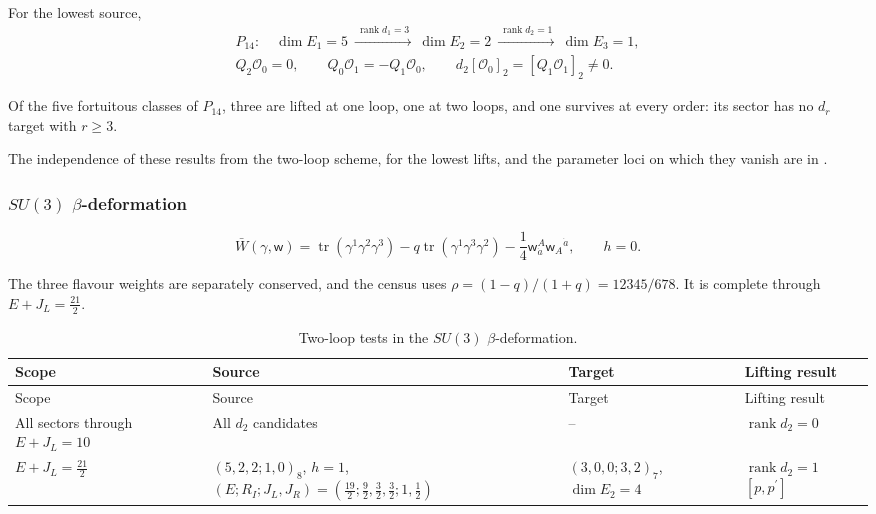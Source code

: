 \documentclass[11pt]{article}
\numberwithin{equation}{section}
\numberwithin{figure}{section}
\numberwithin{table}{section}
\begin{document}
For the lowest source,
\begin{equation}\label{local-ch9-ls-first-pages}
\begin{gathered}
P_{14}:\quad
\dim E_1=5\ \xrightarrow{\ \operatorname{rank}d_1=3\ }\
\dim E_2=2\ \xrightarrow{\ \operatorname{rank}d_2=1\ }\
\dim E_3=1,\\
Q_2\mathcal O_0=0,\qquad
Q_0\mathcal O_1=-Q_1\mathcal O_0,\qquad
d_2[\mathcal O_0]_2=[Q_1\mathcal O_1]_2\ne0.
\end{gathered}
\end{equation}

Of the five fortuitous classes of $P_{14}$, three are lifted at one loop, one at two loops, and one survives at every order: its sector has no $d_r$ target with $r\ge3$.

The independence of these results from the two-loop scheme, for the lowest lifts, and the parameter loci on which they vanish are in \cite[supplement, Sections S6.4 and S6.5]{Repo}.

\subsubsection{$SU(3)$ $\beta$-deformation}\label{sec-results-beta}

\begin{equation}\label{local-ch9-beta-action}
\bar W(\gamma,\mathsf w)
=\operatorname{tr}(\gamma^1\gamma^2\gamma^3)
-q\operatorname{tr}(\gamma^1\gamma^3\gamma^2)
-\frac14\mathsf w_{\dot a}^{A}\mathsf w_A{}^{\dot a},
\qquad h=0.
\end{equation}

The three flavour weights are separately conserved, and the census \cite[supplement, Section S6.7]{Repo} uses $\rho=(1-q)/(1+q)=12345/678$. It is complete through $E+J_L=\tfrac{21}2$.

{\footnotesize\renewcommand{\arraystretch}{1.3}\setlength{\tabcolsep}{3.5pt}
\begin{xltabular}{\linewidth}{|>{\raggedright\arraybackslash}X|>{\raggedright\arraybackslash}X|>{\raggedright\arraybackslash}X|>{\raggedright\arraybackslash}X|}
\caption{Two-loop tests in the $SU(3)$ $\beta$-deformation.}\label{local-ch9-beta-results}\\
\hline
Scope & Source & Target & Lifting result\\
\hline\endfirsthead
\hline
Scope & Source & Target & Lifting result\\
\hline\endhead
All sectors through $E+J_L=10$ & All $d_2$ candidates & -- & $\operatorname{rank}d_2=0$\\
\hline
$E+J_L=\tfrac{21}2$ & $(5,2,2;1,0)_8$, $h=1$,\newline $(E;R_I;J_L,J_R)=(\tfrac{19}2;\tfrac92,\tfrac32,\tfrac32;1,\tfrac12)$ & $(3,0,0;3,2)_7$, $\dim E_2=4$ & $\operatorname{rank}d_2=1$ $[p,p^{\prime}]$\\
\hline
\end{xltabular}}
\end{document}
